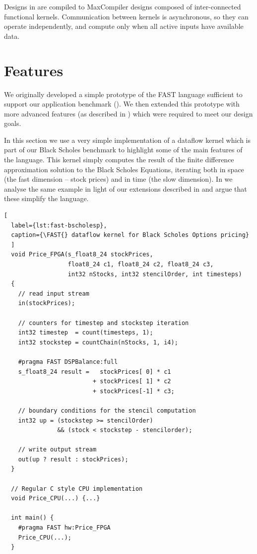 Designs in \FAST{} are compiled to MaxCompiler designs composed of
inter-connected functional kernels. Communication between kernels is
asynchronous, so they can operate independently, and compute only when
all active inputs have available data.

\section{Features}

We originally developed a simple prototype of the FAST language
sufficient to support our application benchmark
(). We then extended this prototype with more
advanced features (as described in ) which
were required to meet our design goals.

In this section we use a very simple implementation of a dataflow
kernel which is part of our Black Scholes benchmark to highlight some
of the main features of the \FAST{} language. This kernel simply
computes the result of the finite difference approximation solution to
the Black Scholes Equations, iterating both in space (the fast
dimension -- stock prices) and in time (the slow dimension). In
 we analyse the same example in light of our
extensions described in  and argue that
these simplify the language.

\lstset{style=MaxC}

\begin{lstlisting}[
  label={lst:fast-bscholesp},
  caption={\FAST{} dataflow kernel for Black Scholes Options pricing}
  ]
  void Price_FPGA(s_float8_24 stockPrices,
                  float8_24 c1, float8_24 c2, float8_24 c3,
                  int32 nStocks, int32 stencilOrder, int timesteps)
  {
    // read input stream
    in(stockPrices);

    // counters for timestep and stockstep iteration
    int32 timestep  = count(timesteps, 1);
    int32 stockstep = countChain(nStocks, 1, i4);

    #pragma FAST DSPBalance:full
    s_float8_24 result =   stockPrices[ 0] * c1
                         + stockPrices[ 1] * c2
                         + stockPrices[-1] * c3;

    // boundary conditions for the stencil computation
    int32 up = (stockstep >= stencilOrder)
               && (stock < stockstep - stencilorder);

    // write output stream
    out(up ? result : stockPrices);
  }

  // Regular C style CPU implementation
  void Price_CPU(...) {...}

  int main() {
    #pragma FAST hw:Price_FPGA
    Price_CPU(...);
  }
\end{lstlisting}

